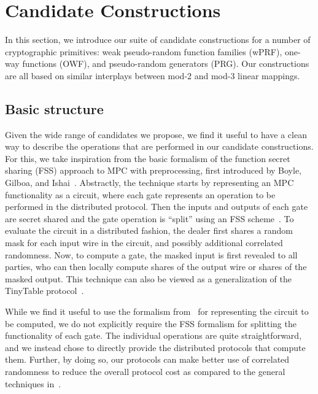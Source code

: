 
\section{Candidate Constructions}
\label{sec:candidates}
In this section, we introduce our suite of candidate constructions for a number of cryptographic primitives: weak pseudo-random function families (wPRF), one-way functions (OWF), and pseudo-random generators (PRG). Our constructions are all based on similar interplays between mod-2 and mod-3 linear mappings. 

\subsection{Basic structure}
Given the wide range of candidates we propose, we find it useful to have a clean way to describe the operations that are performed in our candidate constructions. For this, we take inspiration from the basic formalism of the function secret sharing (FSS) approach to MPC with preprocessing, first introduced by Boyle, Gilboa, and Ishai~\cite{boyle2019-fss-preprocess}. Abstractly, the technique starts by representing an MPC functionality as a circuit, where each gate represents an operation to be performed in the distributed protocol. Then the inputs and outputs of each gate are secret shared and the gate operation is ``split'' using an FSS scheme~\cite{boyle2015-fss,boyle2016-fss-extension}. To evaluate the circuit in a distributed fashion, the dealer first shares a random mask for each input wire in the circuit, and possibly additional correlated randomness. Now, to compute a gate, the masked input is first revealed to all parties, who can then locally compute shares of the output wire or shares of the masked output. This technique can also be viewed as a generalization of the TinyTable protocol~\cite{damgard2017-tinytable}.

While we find it useful to use the formalism from~\cite{boyle2019-fss-preprocess} for representing the circuit to be computed, we do not explicitly require the FSS formalism for splitting the functionality of each gate. The individual operations are quite straightforward, and we instead chose to directly provide the distributed protocols that compute them. Further, by doing so, our protocols can make better use of correlated randomness to reduce the overall protocol cost as compared to the general techniques in~\cite{boyle2019-fss-preprocess}.


